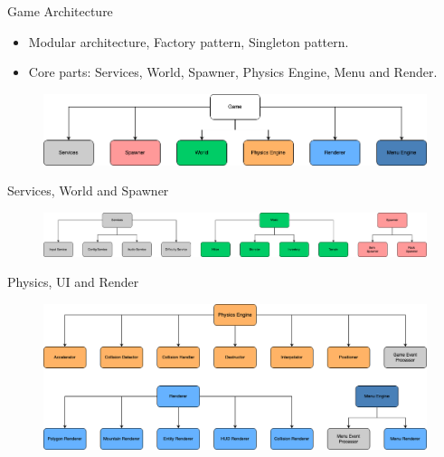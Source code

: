 
\begin{frame}{Game Architecture}
    \begin{itemize}
        \item Modular architecture, Factory pattern, Singleton pattern.
        \item Core parts: Services, World, Spawner, Physics Engine, Menu and Render.
    \end{itemize}
    \begin{figure}
        \centering
        \includegraphics[scale=0.40]{../figures/Game.png}
    \end{figure}
\end{frame}

\begin{frame}{Services, World and Spawner}
    \begin{figure}
        \centering
        \includegraphics[scale=0.25]{../figures/Services-World-Spawner.png}
    \end{figure} 
\end{frame}

\begin{frame}{Physics, UI and Render}
    \begin{figure}
        \centering
        \includegraphics[scale=0.30]{../figures/Physics-Menu-Renderer.png}
    \end{figure} 
\end{frame}


